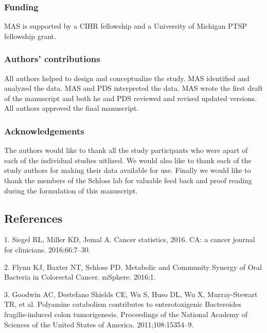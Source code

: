 \documentclass[12pt,]{article}
\begin{document}
\subsubsection{Funding}\label{funding}

MAS is supported by a CIHR fellowship and a University of Michigan PTSP
fellowship grant.

\subsubsection{Authors' contributions}\label{authors-contributions}

All authors helped to design and conceptualize the study. MAS identified
and analyzed the data. MAS and PDS interpreted the data. MAS wrote the
first draft of the manuscript and both he and PDS reviewed and revised
updated versions. All authors approved the final manuscript.

\subsubsection{Acknowledgements}\label{acknowledgements}

The authors would like to thank all the study participants who were
apart of each of the individual studies uitlized. We would also like to
thank each of the study authors for making their data available for use.
Finally we would like to thank the members of the Schloss lab for
valuable feed back and proof reading during the formulation of this
manuscript.

\newpage

\subsection{References}\label{references}

\hypertarget{refs}{}
\hypertarget{ref-siegel_cancer_2016}{}
1. Siegel RL, Miller KD, Jemal A. Cancer statistics, 2016. CA: a cancer
journal for clinicians. 2016;66:7--30.

\hypertarget{ref-flynn_metabolic_2016}{}
2. Flynn KJ, Baxter NT, Schloss PD. Metabolic and Community Synergy of
Oral Bacteria in Colorectal Cancer. mSphere. 2016;1.

\hypertarget{ref-goodwin_polyamine_2011}{}
3. Goodwin AC, Destefano Shields CE, Wu S, Huso DL, Wu X, Murray-Stewart
TR, et al. Polyamine catabolism contributes to enterotoxigenic
Bacteroides fragilis-induced colon tumorigenesis. Proceedings of the
National Academy of Sciences of the United States of America.
2011;108:15354--9.
\end{document}
